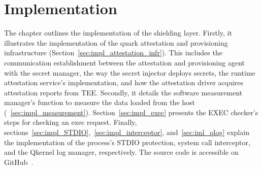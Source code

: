 \chapter{Implementation}
\label{sec:implementation}



The chapter outlines the implementation of the shielding layer. Firstly, it illustrates the implementation of the quark attestation and provisioning infrastructure (Section~\ref{sec:impl_attestation_infr}). This includes the communication establishment between the attestation and provisioning agent 
with the secret manager, the way the secret injector deploys secrets, the runtime attestation service's implementation, and how the attestation driver acquires attestation reports from TEE. Secondly, it details the software measurement manager's function to measure the data loaded from the 
host (~\ref{sec:impl_measurement}). Section~\ref{sec:impl_exec} presents the EXEC checker's steps for checking an exec request. Finally, sections~\ref{sec:impl_STDIO},~\ref{sec:impl_interceptor}, and~\ref{sec:iml_qlog} explain the implementation of the process's STDIO protection, system call 
interceptor, and the Qkernel log manager, respectively. The source code is accessible on GitHub~\cite*{theis_source_code}.

